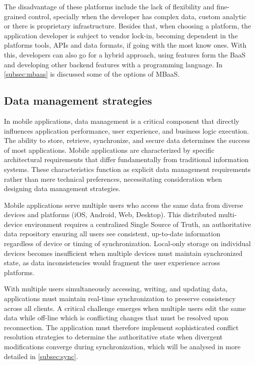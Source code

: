The disadvantage of these platforms include the lack of flexibility and fine-grained control, specially when the developer has complex data, custom analytic or there is proprietary infrastructure. Besides that, when choosing a platform, the application developer is subject to vendor lock-in, becoming dependent in the platforms tools, APIs and data formats, if going with the most know ones. With this, developers can also go for a hybrid approach, using features form the BaaS and developing other backend features with a programming language\cite{ShahJagtapJain2025}. In \ref{subsec:mbaas} is discussed some of the options of MBaaS.



\subsection{Data management strategies}

In mobile applications, data management is a critical component that directly influences application performance, user experience, and business logic execution. The ability to store, retrieve, synchronize, and secure data determines the success of most applications. Mobile applications are characterized by specific architectural requirements that differ fundamentally from traditional information systems. These characteristics function as explicit data management requirements rather than mere technical preferences, necessitating consideration when designing data management strategies.

Mobile applications serve multiple users who access the same data from diverse devices and platforms (iOS, Android, Web, Desktop). This distributed multi-device environment requires a centralized Single Source of Truth, an authoritative data repository ensuring all users see consistent, up-to-date information regardless of device or timing of synchronization. Local-only storage on individual devices becomes insufficient when multiple devices must maintain synchronized state, as data inconsistencies would fragment the user experience across platforms.\cite{dataLayer}

With multiple users simultaneously accessing, writing, and updating data, applications must maintain real-time synchronization to preserve consistency across all clients. A critical challenge emerges when multiple users edit the same data while off-line which is conflicting changes that must be resolved upon reconnection. The application must therefore implement sophisticated conflict resolution strategies to determine the authoritative state when divergent modifications converge during synchronization, which will be analysed in more detailed in \ref{subsec:sync}.

